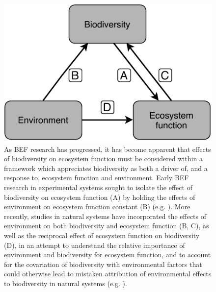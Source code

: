 \begin{refsection}
\begin{figure}
	\includegraphics[width=0.6\linewidth]{img/plas_befr}
	\caption[Schematic diagram of the interactions among biodiversity, environment, and ecosystem function]{As BEF research has progressed, it has become apparent that effects of biodiversity on ecosystem function must be considered within a framework which appreciates biodiversity as both a driver of, and a response to, ecosystem function and environment. Early BEF research in experimental systems sought to isolate the effect of biodiversity on ecosystem function (A) by holding the effects of environment on ecosystem function constant (B) (e.g. \citealt{Cardinale2009}). More recently, studies in natural systems have incorporated the effects of environment on both biodiversity and ecosystem function (B, C), as well as the reciprocal effect of ecosystem function on biodiversity (D), in an attempt to understand the relative importance of environment and biodiversity for ecosystem function, and to account for the covariation of biodiversity with environmental factors that could otherwise lead to mistaken attribution of environmental effects to biodiversity in natural systems (e.g. \citealt{Mora2014}).} 
	\label{background:plas_befr}
\end{figure}


\end{refsection}

